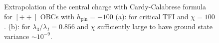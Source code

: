 	\begin{figure}[h!]
		\hspace{-0.9cm}
		\quad
		\caption{Extrapolation of the central charge with Cardy-Calabrese formula for $[++]$ OBCs with $h_\text{pin}=-100$ (a): for critical TFI and $\chi=100$. (b): for $\lambda_3/\lambda_I = 0.856$ and $\chi$ sufficiently large to have ground state variance $\sim 10^{-9}$.}
		\label{fig:cPin}
	\end{figure}

